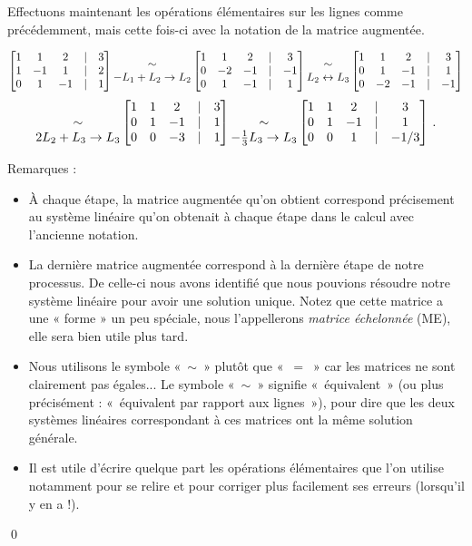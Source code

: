 Effectuons maintenant les opérations élémentaires sur les lignes comme précédemment, mais cette fois-ci avec la notation de la matrice augmentée.

$$
\left[ \begin{matrix} 1 & 1 & 2 & | & 3\\
1 & -1 & 1 & | & 2\\
0 & 1 & -1 & | & 1 \end{matrix} \right] 
\begin{matrix} \sim\\ -L_1+L_2 \to L_2\\ \end{matrix}
\left[ \begin{matrix} 1 & 1 & 2 & | & 3\\
0 & -2 & -1 & | & -1\\
0 & 1 & -1 & | & 1 \end{matrix} \right]
\begin{matrix} \sim\\ L_2 \leftrightarrow L_3 \end{matrix}
\left[ \begin{matrix} 1 & 1 & 2 & | & 3\\
0 & 1 & -1 & | & 1\\
0 & -2 & -1 & | & -1 \end{matrix} \right]
$$
$$
\begin{matrix} \\ \sim\\ 2L_2 + L_3 \to L_3 \end{matrix}
\left[ \begin{matrix} 1 & 1 & 2 & | & 3\\
0 & 1 & -1 & | & 1\\
0 & 0 & -3 & | & 1 \end{matrix} \right]
\begin{matrix} \\ \sim\\ -\frac13 L_3 \to L_3 \end{matrix}
\left[ \begin{matrix} 1 & 1 & 2 & | & 3\\
0 & 1 & -1 & | & 1\\
0 & 0 & 1 & | & -1/3 \end{matrix} \right]\,.
$$

Remarques :
\begin{itemize}
\item À chaque étape, la matrice augmentée qu'on obtient correspond pr\'ecisement au système linéaire qu'on obtenait à chaque étape dans le calcul avec l'ancienne notation.
\item La dernière matrice augmentée correspond à la dernière étape de notre
processus. De celle-ci nous avons identifié que nous pouvions résoudre
notre système linéaire pour avoir une solution unique.  Notez que cette matrice a une  « forme » un peu spéciale, nous l'appellerons \emph{matrice \'echelonn\'ee} (ME), elle sera bien utile plus tard.
\item Nous utilisons le symbole «~$\sim$~» plutôt que «~$=$~» car les matrices
ne sont clairement pas égales...  Le symbole «~$\sim$~» signifie «~équivalent~»  (ou plus précisément : «~équivalent par rapport aux lignes~»), pour dire que les deux systèmes linéaires correspondant à ces matrices ont la même solution générale.
\item Il est utile d'écrire quelque part les opérations élémentaires que l'on utilise notamment pour se relire et pour corriger plus facilement ses erreurs (lorsqu'il y en a !). 
\end{itemize}
\qed


